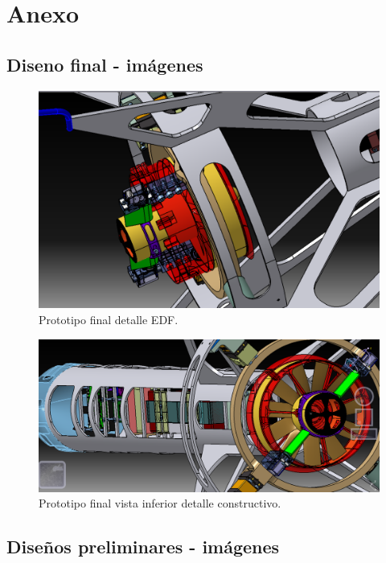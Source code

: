 \null\newpage
\clearpage

\section{Anexo}

\subsection{Diseno final - imágenes}
\begin{figure}[htb]
    \centering
    \includegraphics[width=\linewidth]{fig/design/v6_3}
    \caption{Prototipo final detalle EDF.}
    \label{fig:design/v6_3}
\end{figure}

\begin{figure}[htb]
    \centering
    \includegraphics[width=\linewidth]{fig/design/v6_5}
    \caption{Prototipo final vista inferior detalle constructivo.}
    \label{fig:design/v6_5}
\end{figure}

\subsection{Diseños preliminares - imágenes}

